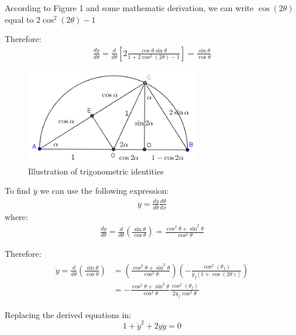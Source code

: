 \documentclass{article}
\begin{document}
According to Figure 1 and some mathematic derivation, we can write $ \cos\left(2\theta\right)$ equal to $2\cos^2\left(2\theta\right) -1$

Therefore:
\begin{eqnarray*}
\frac{d\dot{y}}{d\theta} = \frac{d}{d\theta}\left[2\frac{\cos\theta\sin\theta}{1+2\cos^2\left(2\theta\right) -1} \right] = \frac{\sin\theta}{\cos\theta}
\end{eqnarray*}

\begin{figure}[h]
\centering
\includegraphics [width=3in]{DoubleAngle.png}
\caption{Illustration of trigonometric identities }
\end{figure} 

To find $\ddot{y}$ we can use the following expression:
\begin{eqnarray*}
\ddot{y} = \frac{d\dot{y}}{d\theta}\frac{d\theta}{dx}
\end{eqnarray*}
where:
\begin{eqnarray*}
\frac{d\dot{y}}{d\theta} = \frac{d}{d\theta}\left(\frac{\sin\theta}{\cos\theta}\right) = \frac{\cos^2\theta + \sin^2\theta}{\cos^2\theta}
\end{eqnarray*}



Therefore:
\begin{eqnarray*}
\begin{split}
\ddot{y} = \frac{d}{d\theta}\left(\frac{\sin\theta}{\cos\theta}\right) &= \left( \frac{\cos^2\theta + \sin^2\theta}{\cos^2\theta}\right)\left(- \frac{ \cos^2\left(\theta_f\right)}{y_f \left[1+\cos\left(2\theta\right)\right]} \right)\\
&= -\frac{\cos^2\theta + \sin^2\theta}{\cos^2\theta}\frac{ \cos^2\left(\theta_f\right)}{2y_f\cos^2\theta}
\end{split}
\end{eqnarray*}

Replacing the derived equations in: 
\begin{equation*}
1+\dot{y}^2+2y\ddot{y} = 0
\end{equation*}
\end{document}
